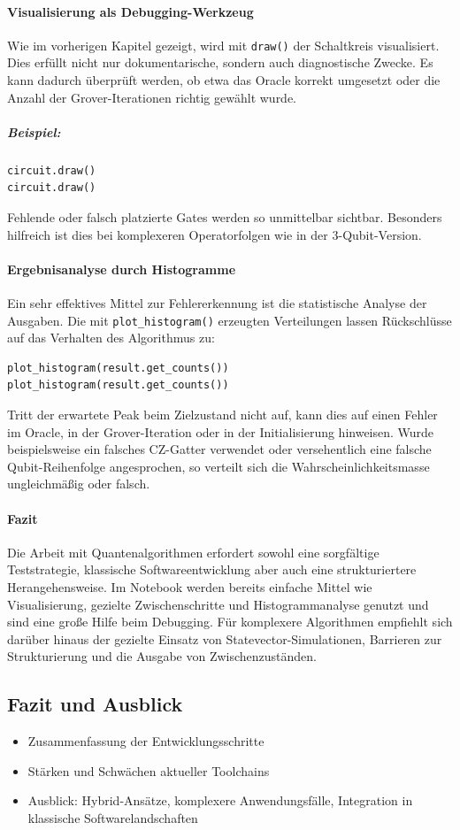 \paragraph*{Visualisierung als Debugging-Werkzeug}
\mbox{}

Wie im vorherigen Kapitel gezeigt, wird mit \texttt{draw()} der Schaltkreis visualisiert. Dies erfüllt nicht nur dokumentarische, sondern auch diagnostische Zwecke. Es kann dadurch überprüft werden, ob etwa das Oracle korrekt umgesetzt oder die Anzahl der Grover-Iterationen richtig gewählt wurde.
\subparagraph*{Beispiel:}
\begin{verbatim}
circuit.draw()
circuit.draw()
\end{verbatim}
Fehlende oder falsch platzierte Gates werden so unmittelbar sichtbar. Besonders hilfreich ist dies bei komplexeren Operatorfolgen wie in der 3-Qubit-Version.

\paragraph*{Ergebnisanalyse durch Histogramme}
\mbox{}

Ein sehr effektives Mittel zur Fehlererkennung ist die statistische Analyse der Ausgaben. Die mit \texttt{plot\_histogram()} erzeugten Verteilungen lassen Rückschlüsse auf das Verhalten des Algorithmus zu:
\begin{verbatim}
plot_histogram(result.get_counts())
plot_histogram(result.get_counts())
\end{verbatim}
Tritt der erwartete Peak beim Zielzustand nicht auf, kann dies auf einen Fehler im Oracle, in der Grover-Iteration oder in der Initialisierung hinweisen. Wurde beispielsweise ein falsches CZ-Gatter verwendet oder versehentlich eine falsche Qubit-Reihenfolge angesprochen, so verteilt sich die Wahrscheinlichkeitsmasse ungleichmäßig oder falsch.

\paragraph*{Fazit}
\mbox{}

Die Arbeit mit Quantenalgorithmen erfordert sowohl eine sorgfältige Teststrategie, klassische Softwareentwicklung aber auch eine strukturiertere Herangehensweise. Im Notebook werden bereits einfache Mittel wie Visualisierung, gezielte Zwischenschritte und Histogrammanalyse genutzt und sind eine große Hilfe beim Debugging. Für komplexere Algorithmen empfiehlt sich darüber hinaus der gezielte Einsatz von Statevector-Simulationen, Barrieren zur Strukturierung und die Ausgabe von Zwischenzuständen.

\subsection{Fazit und Ausblick}
\begin{itemize}
    \item Zusammenfassung der Entwicklungsschritte
    \item Stärken und Schwächen aktueller Toolchains
    \item Ausblick: Hybrid-Ansätze, komplexere Anwendungsfälle, Integration in klassische Softwarelandschaften
\end{itemize}

\printbibliography
